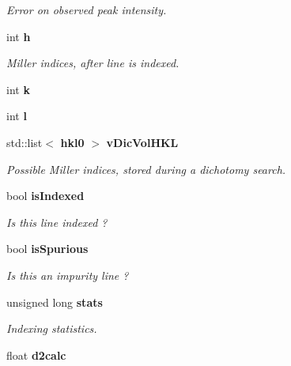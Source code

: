 \begin{DoxyCompactItemize}
\begin{DoxyCompactList}\small\item\em Error on observed peak intensity. \item\end{DoxyCompactList}\item 
int {\bf h}\label{a00035_ac0ab3e1d9bacbeb86c581adc48b61d51}

\begin{DoxyCompactList}\small\item\em Miller indices, after line is indexed. \item\end{DoxyCompactList}\item 
int {\bfseries k}\label{a00035_a2833fb7b4399c1bb5b4c18cdde593bc8}

\item 
int {\bfseries l}\label{a00035_abcbb5600968e6e6ba8cf3249ea347b1f}

\item 
std::list$<$ {\bf hkl0} $>$ {\bf vDicVolHKL}\label{a00035_aac462f11d462e446b70a008118ee979a}

\begin{DoxyCompactList}\small\item\em Possible Miller indices, stored during a dichotomy search. \item\end{DoxyCompactList}\item 
bool {\bf isIndexed}\label{a00035_ac326ec57ba6dd5026512ddb9b9d317c8}

\begin{DoxyCompactList}\small\item\em Is this line indexed ? \item\end{DoxyCompactList}\item 
bool {\bf isSpurious}\label{a00035_a2e7a78636f1ece663db539279ac03837}

\begin{DoxyCompactList}\small\item\em Is this an impurity line ? \item\end{DoxyCompactList}\item 
unsigned long {\bf stats}\label{a00035_a39d25f8e470547a4da7a9e1d3cf9a4fc}

\begin{DoxyCompactList}\small\item\em Indexing statistics. \item\end{DoxyCompactList}\item 
float {\bf d2calc}\label{a00035_a16036f6dea4f34c7715bafa41e08d913}


\end{DoxyCompactItemize}
